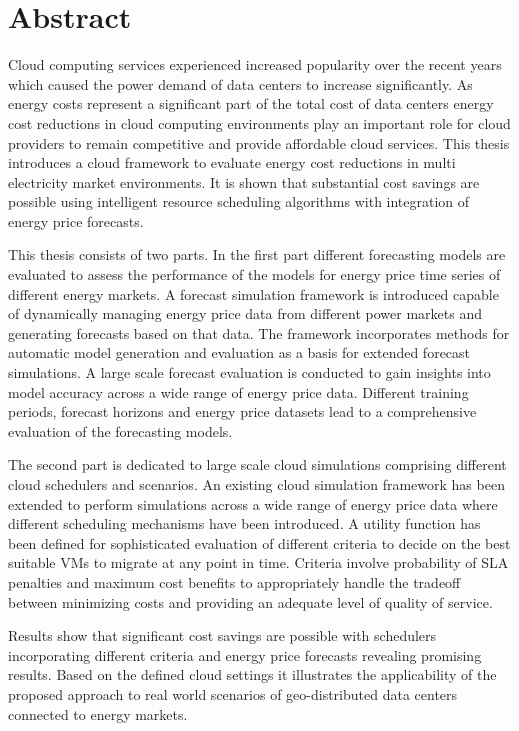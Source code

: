 \chapter*{Abstract}

Cloud computing services experienced increased popularity over the recent years which caused the power demand of data centers to increase significantly. 
As energy costs represent a significant part of the total cost of data centers energy cost reductions in cloud computing environments play an important role for cloud providers to remain competitive and provide affordable cloud services. This thesis introduces a cloud framework to evaluate energy cost reductions in multi electricity market environments. It is shown that substantial cost savings are possible using intelligent resource scheduling algorithms with integration of energy price forecasts. 

This thesis consists of two parts. In the first part different forecasting models are evaluated to assess the performance of the models for energy price time series of different energy markets. A forecast simulation framework is introduced capable of dynamically managing energy price data from different power markets and generating forecasts based on that data. The framework incorporates methods for automatic model generation and evaluation as a basis for extended forecast simulations. 
A large scale forecast evaluation is conducted to gain insights into model accuracy across a wide range of energy price data. Different training periods, forecast horizons and energy price datasets lead to a comprehensive evaluation of the forecasting models. 

The second part is dedicated to large scale cloud simulations comprising different cloud schedulers and scenarios. An existing cloud simulation framework has been extended to perform simulations across a wide range of energy price data where different scheduling mechanisms have been introduced. 
A utility function has been defined for sophisticated evaluation of different criteria to decide on the best suitable VMs to migrate at any point in time. Criteria involve probability of SLA penalties and maximum cost benefits to appropriately handle the tradeoff between minimizing costs and providing an adequate level of quality of service. 

Results show that significant cost savings are possible with schedulers incorporating different criteria and energy price forecasts revealing promising results. Based on the defined cloud settings it illustrates the applicability of the proposed approach to real world scenarios of geo-distributed data centers connected to energy markets. 


